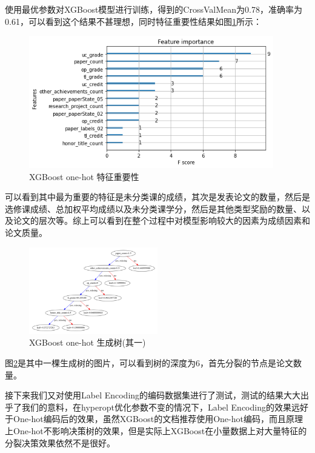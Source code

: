 使用最优参数对XGBoost模型进行训练，得到的CrossValMean为0.78，准确率为0.61，可以看到这个结果不甚理想，同时特征重要性结果如图\ref{XGBoost-one-hot-feature-importance}所示：
\begin{figure}[htb]
  \vspace{13pt} %
  \centering
  \includegraphics[width=0.95\textwidth]{images/XGBoost-one-hot-feature-importance.png}
  \caption{XGBoost one-hot 特征重要性}\label{XGBoost-one-hot-feature-importance} %
\end{figure}

可以看到其中最为重要的特征是未分类课的成绩，其次是发表论文的数量，然后是选修课成绩、总加权平均成绩以及未分类课学分，然后是其他类型奖励的数量、以及论文的层次等。综上可以看到在整个过程中对模型影响较大的因素为成绩因素和论文质量。

\begin{figure}[htb]
  \vspace{13pt} %
  \centering
  \includegraphics[width=0.5\textwidth]{images/XGBoost-one-hot-decision-tree.png}
  \caption{XGBoost one-hot 生成树(其一)}\label{XGBoost-one-hot-decision-tree} %
\end{figure}
图\ref{XGBoost-one-hot-decision-tree}是其中一棵生成树的图片，可以看到树的深度为6，首先分裂的节点是论文数量。

接下来我们又对使用Label Encoding的编码数据集进行了测试，测试的结果大大出乎了我们的意料，在hyperopt优化参数不变的情况下，Label Encoding的效果远好于One-hot编码后的效果，虽然XGBoost的文档推荐使用One-hot编码，而且原理上One-hot不影响决策树的效果，但是实际上XGBoost在小量数据上对大量特征的分裂决策效果依然不是很好。


